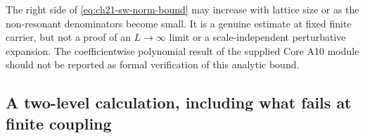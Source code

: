 \begin{remark}
The right side of \eqref{eq:ch21-sw-norm-bound} may increase with
lattice size or as the non-resonant denominators become small.  It is
a genuine estimate at fixed finite carrier, but not a proof of an
$L\to\infty$ limit or a scale-independent perturbative expansion.
The coefficientwise polynomial result of the supplied Core A10 module
should not be reported as formal verification of this analytic bound.
\end{remark}

\subsection{A two-level calculation, including what fails at finite coupling}
\label{subsec:ch21-two-level}

